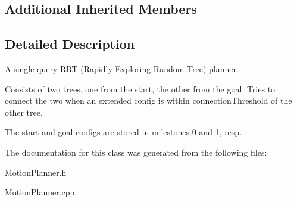 \subsection*{Additional Inherited Members}


\subsection{Detailed Description}
A single-\/query R\+RT (Rapidly-\/\+Exploring Random Tree) planner. 

Consists of two trees, one from the start, the other from the goal. Tries to connect the two when an extended config is within connection\+Threshold of the other tree.

The start and goal configs are stored in milestones 0 and 1, resp. 

The documentation for this class was generated from the following files\+:\begin{DoxyCompactItemize}
\item 
Motion\+Planner.\+h\item 
Motion\+Planner.\+cpp\end{DoxyCompactItemize}
